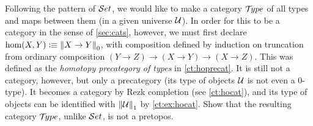 \documentclass[hott-all.tex]{subfiles}
\begin{document}
% 
% 
% 
% 
% 
% 
\sectionExercises
% 
\begin{ex}
  Following the pattern of $\mathcal{S}et$, we would like to make a category $\mathcal{T}\!ype$ of all types and maps between them (in a given universe $\mathcal{U}$).  In order for this to be a category in the sense of \cref{sec:cats}, however, we must first declare $\hom(X,Y) \vcentcolon\equiv \mathopen{}\left\Vert X\to Y\right\Vert_{0}\mathclose{}$, with composition defined by induction on truncation from ordinary composition $(Y\to Z) \to (X\to Y) \to (X\to Z)$.  This was defined as the \emph{homotopy precategory of types} in \cref{ct:hoprecat}.  It is still not a category, however, but only a precategory (its type of objects $\mathcal{U}$ is not even a $0$-type).  It becomes a category by Rezk completion
  (see \cref{ct:hocat}), and its type of objects can be identified with $\mathopen{}\left\Vert \mathcal{U}\right\Vert_{1}\mathclose{}$ by \cref{ct:ex:hocat}.  Show that the resulting category $\mathcal{T}\!ype$, unlike $\mathcal{S}et$, is not a pretopos.
\end{ex}
\end{document}
